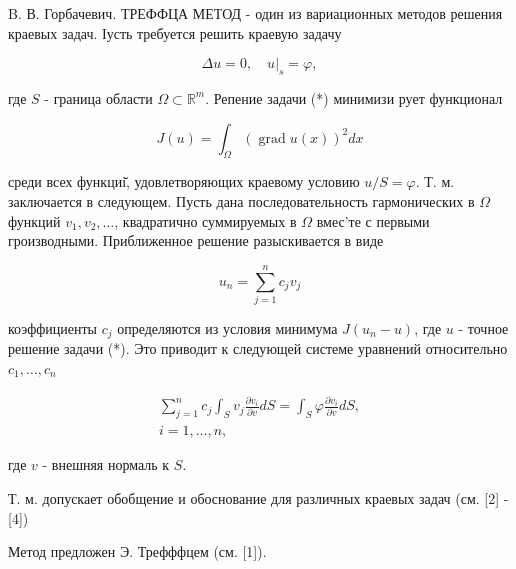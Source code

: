 \documentclass[10pt]{article}
\begin{document}
B. В. Горбачевич. ТРЕФФЦА МЕТОД - один из вариационных методов решения краевых задач. Іусть требуется решить краевую задачу



\[

\Delta u=0,\left.\quad u\right|_{s}=\varphi,

\]



где $S$ - граница области $\Omega \subset \mathbb{R}^{m}$. Репение задачи (*) минимизи рует функционал



\[

J(u)=\int_{\Omega}(\operatorname{grad} u(x))^{2} d x

\]



среди всех функциі̆, удовлетворяющих краевому условию $u / S=\varphi$. Т. м. заключается в следующем. Пусть дана последовательность гармонических в $\Omega$ функций $v_{1}, v_{2}, \ldots$, квадратично суммируемых в $\Omega$ вмес'те с первыми гроизводными. Приближенное решение разыскивается в виде



\[

u_{n}=\sum_{j=1}^{n} c_{j} v_{j}

\]



коэффициенты $c_{j}$ определяются из условия минимума $J\left(u_{n}-u\right)$, где $u$ - точное решение задачи (*). Это приводит к следующей системе уравнений относительно $c_{1}, \ldots, c_{n}$



\[

\begin{gathered}

\sum_{j=1}^{n} c_{j} \int_{S} v_{j} \frac{\partial v_{i}}{\partial v} d S=\int_{S} \varphi \frac{\partial v_{i}}{\partial v} d S, \\

i=1, \ldots, n,

\end{gathered}

\]



где $v$ - внешняя нормаль к $S$.



Т. м. допускает обобщение и обоснование для различных краевых задач (см. [2] - [4])



Метод предложен Э. Трефффцем (см. [1]).
\end{document}
